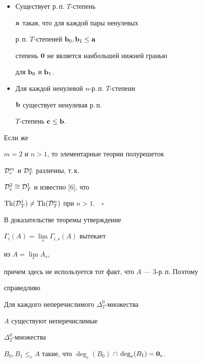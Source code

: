 \begin{itemize}


\item[1)] Существует р.\,п. $T$-степень


${\bold a}$ такая, что для каждой пары ненулевых 


р.\,п. $T$-степеней ${\bold b}_0,{\bold b}_1\le {\bold a}$


степень ${\bold 0}$ не является наибольшей нижней гранью


для ${\bold b}_0$ и ${\bold b}_1$.


\item[2)] Для каждой ненулевой $n$-р.\,п. $T$-степени


${\bold b}$ существует ненулевая р.\,п.


$T$-степень ${\bold c}\le{\bold b}$.


\end{itemize}


Если же


$m=2$ и $n>1$, то элементарные теории полурешеток


${\cal D}_e^{m}$ и ${\cal D}_T^{n}$ различны, т.\,к.


${\cal D}_e^{2}\cong {\cal D}_T^{1}$ и известно [6], что


$\operatorname{Th}({\cal D}_T^{1})\ne\operatorname{Th}({\cal D}_T^{n})$ при $n>1$.$\quad\square$ 





В доказательстве теоремы утверждение


$\Gamma_i(A)=\lim\limits_s\Gamma_{i,s}(A)$ вытекает


из $A=\lim\limits_s A_s$,


причем здесь не используется тот факт, что $A$ --- $3$-р.\,п. Поэтому


справедливо





\begin{cor}


Для каждого неперечислимого $\Delta_2^0$-множества


$A$ существуют неперечислимые


$\Delta_2^0$-множества


$B_0, B_1\le_e A$ такие, что $\deg_e(B_0)$ $\cap$ $\deg_e(B_1)={\bold 0}_e$.


\end{cor}





